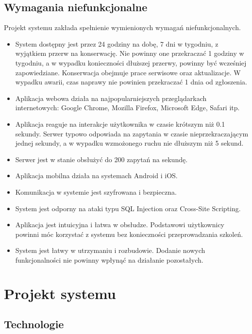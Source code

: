 \subsection{Wymagania niefunkcjonalne}

Projekt systemu zakłada spełnienie wymienionych wymagań niefunkcjonalnych.

\begin{itemize}
    \item System dostępny jest przez 24 godziny na dobę, 7 dni w tygodniu, z wyjątkiem przerw na konserwację. Nie powinny one przekraczać 1 godziny w tygodniu, a w wypadku konieczności dłuższej przerwy, powinny być wcześniej zapowiedziane. Konserwacja obejmuje prace serwisowe oraz aktualizacje. W wypadku awarii, czas naprawy nie powinien przekraczać 1 dnia od zgłoszenia.
    \item Aplikacja webowa działa na najpopularniejszych przeglądarkach internetowych: Google Chrome, Mozilla Firefox, Microsoft Edge, Safari itp.
    \item Aplikacja reaguje na interakcje użytkownika w czasie krótszym niż 0.1 sekundy. Serwer typowo odpowiada na zapytania w czasie nieprzekraczającym jednej sekundy, a w wypadku wzmożonego ruchu nie dłuższym niż 5 sekund.
    \item Serwer jest w stanie obsłużyć do 200 zapytań na sekundę.
    \item Aplikacja mobilna działa na systemach Android i iOS.
    \item Komunikacja w systemie jest szyfrowana i bezpieczna.
    \item System jest odporny na ataki typu SQL Injection oraz Cross-Site Scripting.
    \item Aplikacja jest intuicyjna i łatwa w obsłudze. Podstawowi użytkownicy powinni móc korzystać z systemu bez konieczności przeprowadzania szkoleń.
    \item System jest łatwy w utrzymaniu i rozbudowie. Dodanie nowych funkcjonalności nie powinny wpłynąć na działanie pozostałych.
\end{itemize}

\section{Projekt systemu}

\subsection{Technologie}

